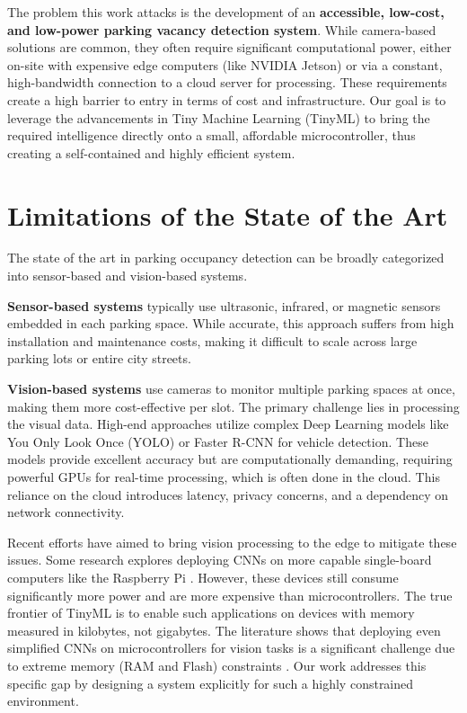 \documentclass[sigconf,10pt,nonacm]{acmart}
\begin{document}
The problem this work attacks is the development of an \textbf{accessible, low-cost, and low-power parking vacancy detection system}. While camera-based solutions are common, they often require significant computational power, either on-site with expensive edge computers (like NVIDIA Jetson) or via a constant, high-bandwidth connection to a cloud server for processing. These requirements create a high barrier to entry in terms of cost and infrastructure. Our goal is to leverage the advancements in Tiny Machine Learning (TinyML) to bring the required intelligence directly onto a small, affordable microcontroller, thus creating a self-contained and highly efficient system.

\section{Limitations of the State of the Art}
\label{sec:limitations}
The state of the art in parking occupancy detection can be broadly categorized into sensor-based and vision-based systems.

\noindent\textbf{Sensor-based systems} typically use ultrasonic, infrared, or magnetic sensors embedded in each parking space. While accurate, this approach suffers from high installation and maintenance costs, making it difficult to scale across large parking lots or entire city streets.

\noindent\textbf{Vision-based systems} use cameras to monitor multiple parking spaces at once, making them more cost-effective per slot. The primary challenge lies in processing the visual data. High-end approaches utilize complex Deep Learning models like You Only Look Once (YOLO) or Faster R-CNN for vehicle detection. These models provide excellent accuracy but are computationally demanding, requiring powerful GPUs for real-time processing, which is often done in the cloud. This reliance on the cloud introduces latency, privacy concerns, and a dependency on network connectivity.

Recent efforts have aimed to bring vision processing to the edge to mitigate these issues. Some research explores deploying CNNs on more capable single-board computers like the Raspberry Pi \cite{rpi-parking}. However, these devices still consume significantly more power and are more expensive than microcontrollers. The true frontier of TinyML is to enable such applications on devices with memory measured in kilobytes, not gigabytes. The literature shows that deploying even simplified CNNs on microcontrollers for vision tasks is a significant challenge due to extreme memory (RAM and Flash) constraints \cite{tinyml-challenges}. Our work addresses this specific gap by designing a system explicitly for such a highly constrained environment.
\end{document}
